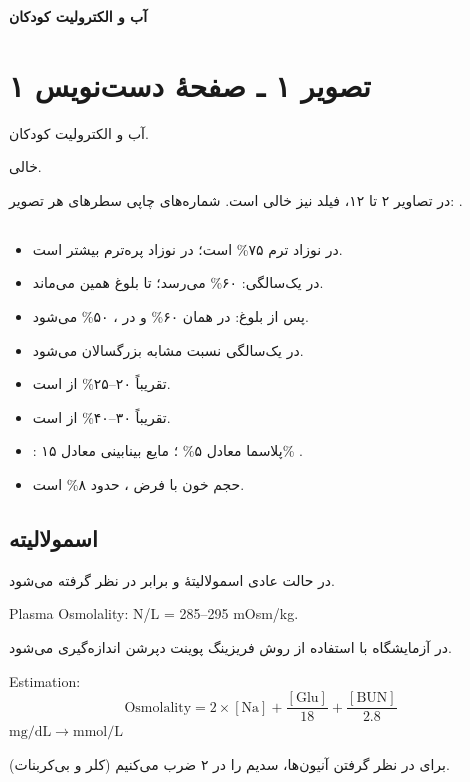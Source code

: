 \documentclass[12pt,a4paper]{article}
\begin{document}
\fi
\providecommand{\EDm}[1]{\lr{\(#1\)}}
\providecommand{\EDunclear}[1]{\textbf{[خوانش نامطمئن: #1]}}
\providecommand{\EDpage}[1]{\clearpage\section*{تصویر #1 ـ صفحهٔ دست‌نویس #1}}
\begin{center}
{\Large\bfseries آب و الکترولیت کودکان}
\end{center}
\section*{تصویر ۱ ـ صفحهٔ دست‌نویس ۱}
 آب و الکترولیت کودکان.\par
{} خالی.\par
در تصاویر ۲ تا ۱۲، فیلد  نیز خالی است. شماره‌های چاپی سطرهای هر تصویر: .

\subsection*{}
\begin{itemize}
\item در نوزاد ترم ۷۵\% است؛ در نوزاد پره‌ترم بیشتر است.
\item در یک‌سالگی: ۶۰\% می‌رسد؛ تا بلوغ همین می‌ماند.
\item پس از بلوغ: در  همان ۶۰\% و در ، ۵۰\% می‌شود.
\item در یک‌سالگی نسبت \EDm{\dfrac{ICF}{ECF}} مشابه بزرگسالان می‌شود.
\item {} تقریباً ۲۰--۲۵\% از  است.
\item {} تقریباً ۳۰--۴۰\% از  است.
\item {}: پلاسما معادل ۵\% ؛ مایع بینابینی معادل ۱۵\% .
\item حجم خون با فرض \EDm{HCT=40\%}، حدود ۸\%  است.
\end{itemize}
\subsection*{اسمولالیته}
در حالت عادی اسمولالیتهٔ  و  برابر در نظر گرفته می‌شود.
\begin{latin}
Plasma Osmolality: N/L = 285--295 mOsm/kg.
\end{latin}
در آزمایشگاه با استفاده از روش فریزینگ پوینت دپرشن اندازه‌گیری می‌شود.
\begin{latin}
Estimation:
\[
\mathrm{Osmolality}=2\times[\mathrm{Na}]+\frac{[\mathrm{Glu}]}{18}+\frac{[\mathrm{BUN}]}{2.8}
\]
\(\mathrm{mg/dL}\longrightarrow\mathrm{mmol/L}\)
\end{latin}
برای در نظر گرفتن آنیون‌ها، سدیم را در ۲ ضرب می‌کنیم (کلر و بی‌کربنات).
\end{document}
